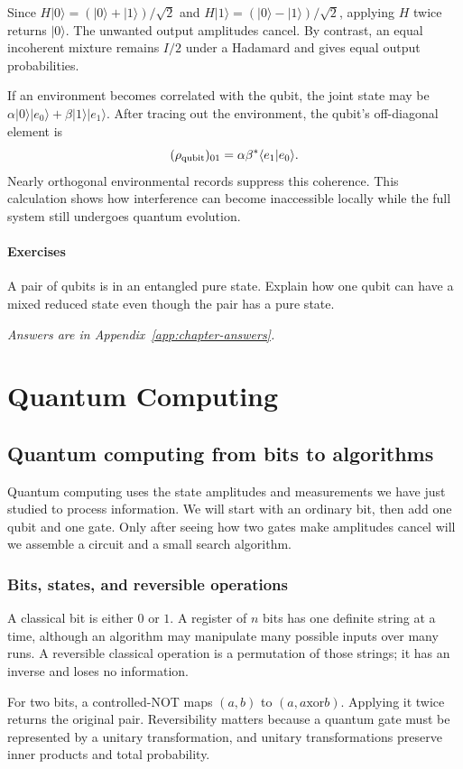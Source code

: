 \documentclass[11pt,oneside]{book}
\newcommand{\ket}[1]{\lvert #1\rangle}
\theoremstyle{reviewstyle}
\newcommand{\learningcheck}[1]{\subsection*{Exercises}\noindent #1\par\smallskip\noindent\emph{Answers are in Appendix~\ref{app:chapter-answers}.}}
\begin{document}
Since $H\ket0=(\ket0+\ket1)/\sqrt2$ and $H\ket1=(\ket0-\ket1)/\sqrt2$, applying $H$ twice returns $\ket0$. The unwanted output amplitudes cancel. By contrast, an equal incoherent mixture remains $I/2$ under a Hadamard and gives equal output probabilities.

If an environment becomes correlated with the qubit, the joint state may be $\alpha\ket0\ket{e_0}+\beta\ket1\ket{e_1}$. After tracing out the environment, the qubit's off-diagonal element is
\begin{equation}
(\rho_{\rm qubit})_{01}=\alpha\beta^*\langle e_1|e_0\rangle.
\end{equation}
Nearly orthogonal environmental records suppress this coherence. This calculation shows how interference can become inaccessible locally while the full system still undergoes quantum evolution.

\learningcheck{A pair of qubits is in an entangled pure state. Explain how one qubit can have a mixed reduced state even though the pair has a pure state.}

\part{Quantum Computing}
\chapter{Quantum computing from bits to algorithms}
Quantum computing uses the state amplitudes and measurements we have just studied to process information. We will start with an ordinary bit, then add one qubit and one gate. Only after seeing how two gates make amplitudes cancel will we assemble a circuit and a small search algorithm.

\section{Bits, states, and reversible operations}
A classical bit is either $0$ or $1$. A register of $n$ bits has one definite string at a time, although an algorithm may manipulate many possible inputs over many runs. A reversible classical operation is a permutation of those strings; it has an inverse and loses no information.

For two bits, a controlled-NOT maps $(a,b)$ to $(a,a\mathbin{\mathrm{xor}}b)$. Applying it twice returns the original pair. Reversibility matters because a quantum gate must be represented by a unitary transformation, and unitary transformations preserve inner products and total probability.
\end{document}
